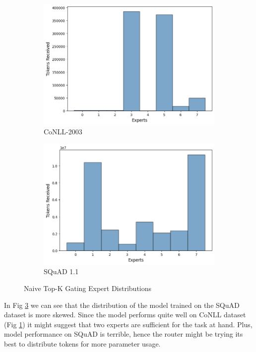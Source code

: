 \documentclass[12pt]{article}
\begin{document}
\begin{figure}[h]
\centering
\begin{subfigure}{.5\textwidth}
  \centering
  \includegraphics[width=1\linewidth]{report_images/conll/naive.png}
  \caption{CoNLL-2003}
  \label{fig:naive_conll}
\end{subfigure}%
\begin{subfigure}{.5\textwidth}
  \centering
  \includegraphics[width=1\linewidth]{report_images/squad/naive.png}
  \caption{SQuAD 1.1}
  \label{fig:naive_squad}
\end{subfigure}
\caption{Naive Top-K Gating Expert Distributions}
\label{fig:naive}
\end{figure}
\FloatBarrier
\noindent
In Fig \ref{fig:naive} we can see that the distribution of the model trained on the SQuAD dataset is more skewed. Since the model performs quite well on CoNLL dataset (Fig \ref{fig:naive_conll}) it might suggest that two experts are sufficient for the task at hand. Plus, model performance on SQuAD is terrible, hence the router might be trying its best to distribute tokens for more parameter usage.
\end{document}
